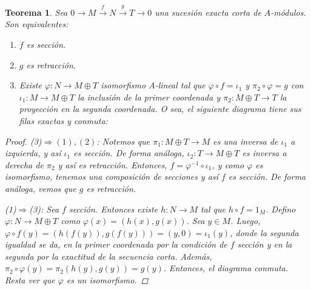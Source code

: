 \documentclass[12pt]{book}
\newtheorem{teo}{Teorema}[section]
\theoremstyle{definition}
\begin{document}
\begin{teo}
Sea $0\longrightarrow M \stackrel{f}{\longrightarrow} N \stackrel{g}{\longrightarrow} T\longrightarrow 0$ una sucesión exacta corta de $A$-módulos. Son equivalentes:
\begin{enumerate}
\item $f$ es sección.
\item $g$ es retracción.
\item Existe $\varphi:N\to M\oplus T$ isomorfismo $A$-lineal tal que $\varphi\circ f = \iota_1$ y $\pi_2\circ \varphi = g$ con $\iota_1:M\to M\oplus T$ la inclusión de la primer coordenada y $\pi_2:M\oplus T\to T$ la proyección en la segunda coordenada. O sea, el siguiente diagrama tiene sus filas exactas y conmuta:
\begin{center}
\end{center}
\end{enumerate}
\begin{proof}
(\textit{3})$\Longrightarrow (\textit{1}),(\textit{2})$: Notemos que $\pi_1:M\oplus T\to M$ es una inversa de $\iota_1$ a izquierda, y así $\iota_1$ es sección. De forma análoga, $\iota_2:T\to M\oplus T$ es inversa a derecha de $\pi_2$ y así es retracción. Entonces, $f = \varphi^{-1}\circ \iota_1$, y como $\varphi$ es isomorfismo, tenemos una composición de secciones y así $f$ es sección. De forma análoga, vemos que $g$ es retracción.

(\textit{1})$\Longrightarrow$(\textit{3}): Sea $f$ sección. Entonces existe $h:N\to M$ tal que $h\circ f = 1_M$. Defino $\varphi : N\to M\oplus T$ como $\varphi(x)=(h(x),g(x))$. Sea $y\in M$. Luego, $\varphi\circ f(y)=(h(f(y)),g(f(y))) = (y,0) = \iota_1(y)$, donde la segunda igualdad se da, en la primer coordenada por la condición de $f$ sección y en la segunda por la exactitud de la secuencia corta. Además, $\pi_2\circ\varphi(y)=\pi_2(h(y),g(y)) = g(y)$. Entonces, el diagrama conmuta. Resta ver que $\varphi$ es un isomorfismo.


\end{proof}
\end{teo}
\end{document}
